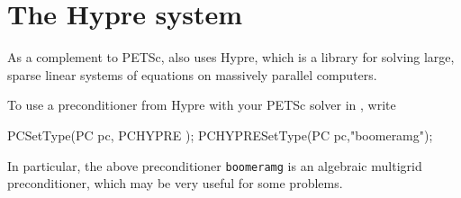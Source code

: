 \section{The Hypre system}

As a complement to PETSc, \dolfin{} also uses Hypre, which is a 
library for solving large, sparse linear systems of equations on massively parallel computers. 

To use a preconditioner from Hypre with your PETSc solver in \dolfin{}, write 
\begin{code}
PCSetType(PC pc, PCHYPRE );
PCHYPRESetType(PC pc,"boomeramg");
\end{code}

In particular, the above preconditioner \texttt{boomeramg} is an algebraic multigrid 
preconditioner, which may be very useful for some problems. 

